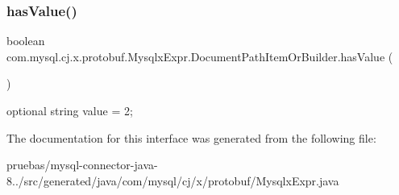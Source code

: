 \subsubsection{\texorpdfstring{has\+Value()}{hasValue()}}
{\footnotesize\ttfamily boolean com.\+mysql.\+cj.\+x.\+protobuf.\+Mysqlx\+Expr.\+Document\+Path\+Item\+Or\+Builder.\+has\+Value (\begin{DoxyParamCaption}{ }\end{DoxyParamCaption})}

{\ttfamily optional string value = 2;} 

The documentation for this interface was generated from the following file\+:\begin{DoxyCompactItemize}
\item 
pruebas/mysql-\/connector-\/java-\/8../src/generated/java/com/mysql/cj/x/protobuf/Mysqlx\+Expr.\+java\end{DoxyCompactItemize}
